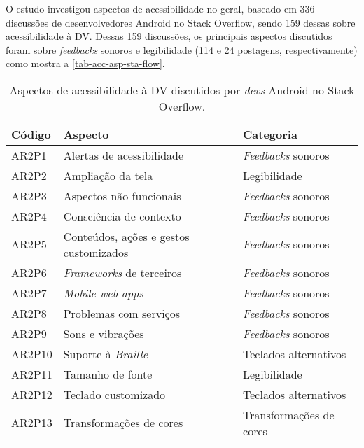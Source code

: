 O estudo investigou aspectos de acessibilidade no geral, baseado em 336 discussões de desenvolvedores Android no Stack Overflow, sendo 159 dessas sobre acessibilidade à DV\@.
Dessas 159 discussões, os principais aspectos discutidos foram sobre \emph{feedbacks} sonoros e legibilidade (114 e 24 postagens, respectivamente) como mostra a \autoref{tab-acc-asp-sta-flow}.

\begin{table}[htb]
  \begin{center}
    \ABNTEXfontereduzida
    \caption{Aspectos de acessibilidade à DV discutidos por \emph{devs} Android no Stack Overflow.}
    \label{tab-acc-asp-sta-flow}
    \begin{tabular}{p{1.2cm}|p{7.0cm}|p{3.8cm}}
      \textbf{Código} & \textbf{Aspecto}                       & \textbf{Categoria}       \\
      \hline
      AR2P1           & Alertas de acessibilidade              & \emph{Feedbacks} sonoros \\
      \hline
      AR2P2           & Ampliação da tela                      & Legibilidade             \\
      \hline
      AR2P3           & Aspectos não funcionais                & \emph{Feedbacks} sonoros \\
      \hline
      AR2P4           & Consciência de contexto                & \emph{Feedbacks} sonoros \\
      \hline
      AR2P5           & Conteúdos, ações e gestos customizados & \emph{Feedbacks} sonoros \\
      \hline
      AR2P6           & \emph{Frameworks} de terceiros         & \emph{Feedbacks} sonoros \\
      \hline
      AR2P7           & \emph{Mobile web apps}                 & \emph{Feedbacks} sonoros \\
      \hline
      AR2P8           & Problemas com serviços                 & \emph{Feedbacks} sonoros \\
      \hline
      AR2P9           & Sons e vibrações                       & \emph{Feedbacks} sonoros \\
      \hline
      AR2P10          & Suporte à \emph{Braille}               & Teclados alternativos    \\
      \hline
      AR2P11          & Tamanho de fonte                       & Legibilidade             \\
      \hline
      AR2P12          & Teclado customizado                    & Teclados alternativos    \\
      \hline
      AR2P13          & Transformações de cores                & Transformações de cores  \\
    \end{tabular}
  \end{center}
\end{table}

